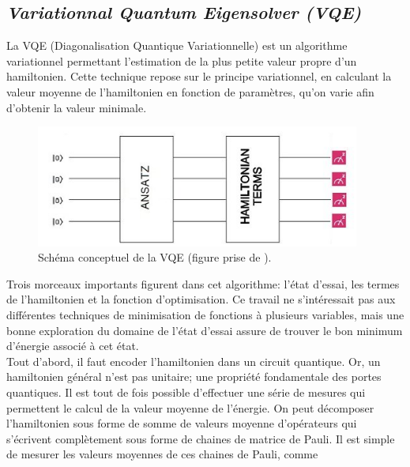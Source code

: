 \documentclass[../main.tex]{subfiles}
\begin{document}
    \subsection{\textit{Variationnal Quantum Eigensolver (VQE)}} %
    \label{ssub:vqe}
        La VQE (Diagonalisation Quantique Variationnelle) est un algorithme
        variationnel permettant l'estimation de la plus petite valeur propre
        d'un hamiltonien. Cette technique repose sur le principe variationnel,
        en calculant la valeur moyenne de l'hamiltonien en fonction de paramètres,
        qu'on varie afin d'obtenir la valeur minimale.
        \begin{figure}[H]
            \begin{center}
                \includegraphics[width=0.95\textwidth]{figs/Schematic-of-quantum-circuit-used-for-VQE-Ansatz-is-created-by-using-different.png}
            \end{center}
            \caption{Schéma conceptuel de la VQE (figure prise de \cite{fig_vqe}).}
            \label{fig:vqe}
        \end{figure}
        Trois morceaux importants figurent dans cet algorithme: l'état d'essai,
        les termes de l'hamiltonien et la fonction d'optimisation. Ce travail
        ne s'intéressait pas aux différentes techniques de minimisation de
        fonctions à plusieurs variables, mais une bonne exploration du domaine
        de l'état d'essai assure de trouver le bon minimum d'énergie associé
        à cet état.\\
        Tout d'abord, il faut encoder l'hamiltonien dans un circuit quantique.
        Or, un hamiltonien général n'est pas unitaire; une propriété fondamentale
        des portes quantiques. Il est tout de fois possible d'effectuer une série
        de mesures qui permettent le calcul de la valeur moyenne de l'énergie.
        On peut décomposer l'hamiltonien sous forme de somme de valeurs moyenne
        d'opérateurs qui s'écrivent complètement sous forme de chaines de matrice de Pauli.
        Il est simple de mesurer les valeurs moyennes de ces chaines de Pauli, comme
\end{document}
